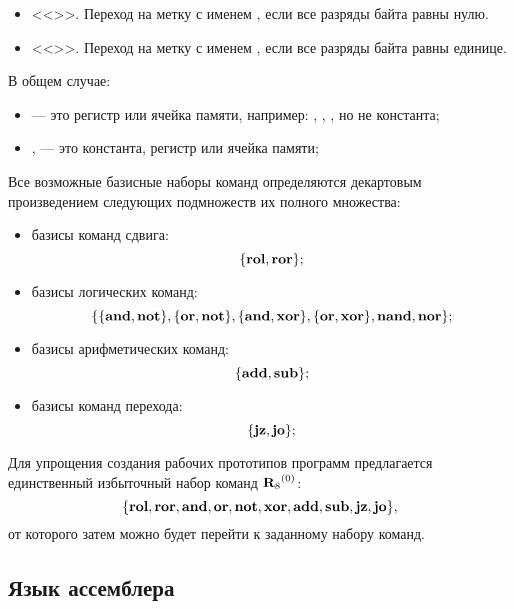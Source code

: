 \begin{itemize}
    \item <<>>. Переход на метку с именем , если все разряды байта  равны нулю.
    \item <<>>. Переход на метку с именем , если все разряды байта  равны единице.
\end{itemize}

В общем случае:
\begin{itemize}
    \item {} --- это регистр или ячейка памяти, например: , \Machine{[0]}, \Machine{[r0]}, но не константа;
    \item {},  --- это константа, регистр или ячейка памяти;
\end{itemize}

Все возможные базисные наборы команд определяются декартовым произведением следующих подмножеств их полного множества:
\begin{itemize}
    \item базисы команд сдвига:
        \[\{\texttt{\bf{rol}},\texttt{\bf{ror}}\};\]
    \item базисы логических команд:
        \[\{ \{\texttt{\bf{and}},\texttt{\bf{not}}\}, \{\texttt{\bf{or}},\texttt{\bf{not}}\}, \{\texttt{\bf{and}},\texttt{\bf{xor}}\}, \{\texttt{\bf{or}},\texttt{\bf{xor}}\}, \texttt{\bf{nand}},\texttt{\bf{nor}} \};\]
    \item базисы арифметических команд:
        \[\{ \texttt{\bf{add}},\texttt{\bf{sub}} \};\]
    \item базисы команд перехода:
        \[\{ \texttt{\bf{jz}},\texttt{\bf{jo}} \};\]
\end{itemize}

Для упрощения создания рабочих прототипов программ предлагается единственный избыточный набор команд $\text{$\mathbf{R}_8$}^{(0)}$:
        \[\{ \texttt{\bf{rol}},\texttt{\bf{ror}}, \texttt{\bf{and}}, \texttt{\bf{or}}, \texttt{\bf{not}}, \texttt{\bf{xor}}, \texttt{\bf{add}},\texttt{\bf{sub}}, \texttt{\bf{jz}}, \texttt{\bf{jo}} \}, \]
от которого затем можно будет перейти к заданному набору команд.


\subsection{Язык ассемблера \MyProc}

